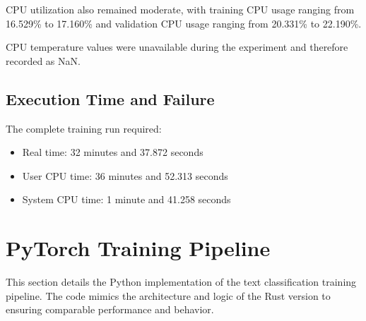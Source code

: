 \documentclass[11pt,a4paper]{article}
\begin{document}
CPU utilization also remained moderate, with training CPU usage ranging from 16.529\% to 17.160\% and validation CPU usage ranging from 20.331\% to 22.190\%.

CPU temperature values were unavailable during the experiment and therefore recorded as NaN.

\subsection{Execution Time and Failure}

The complete training run required:

\begin{itemize}
    \item Real time: 32 minutes and 37.872 seconds
    \item User CPU time: 36 minutes and 52.313 seconds
    \item System CPU time: 1 minute and 41.258 seconds
\end{itemize}

\section{PyTorch Training Pipeline}
This section details the Python implementation of the text classification training pipeline. The code mimics the architecture and logic of the Rust version to ensuring comparable performance and behavior.
\end{document}
